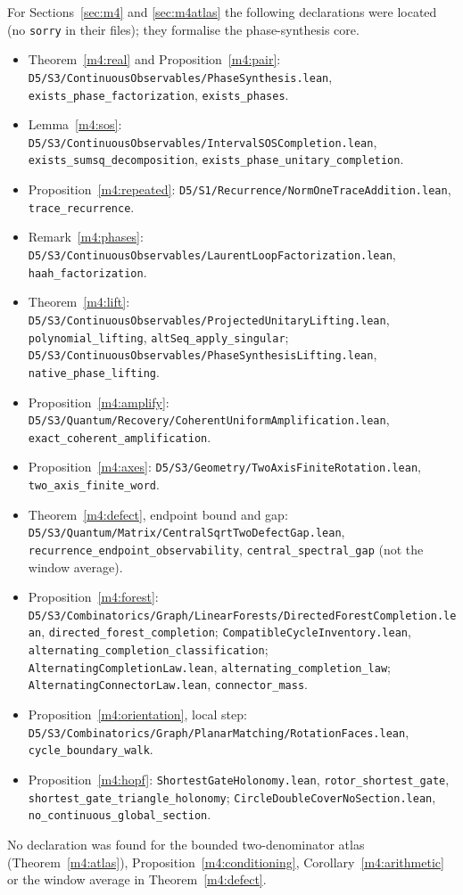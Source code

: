 \documentclass[11pt,reqno]{amsart}
\theoremstyle{definition}
\theoremstyle{remark}
\numberwithin{equation}{section}
\begin{document}
For Sections~\ref{sec:m4} and \ref{sec:m4atlas} the following declarations were located (no \texttt{sorry} in their files); they
formalise the phase-synthesis core.
{\small\raggedright
\begin{itemize}[leftmargin=1.5em]
\item Theorem~\ref{m4:real} and Proposition~\ref{m4:pair}: \texttt{D5/S3/ContinuousObservables/PhaseSynthesis.lean},
\texttt{exists\_phase\_factorization}, \texttt{exists\_phases}.
\item Lemma~\ref{m4:sos}: \texttt{D5/S3/ContinuousObservables/IntervalSOSCompletion.lean}, \texttt{exists\_sumsq\_decomposition},
\texttt{exists\_phase\_unitary\_completion}.
\item Proposition~\ref{m4:repeated}: \texttt{D5/S1/Recurrence/NormOneTraceAddition.lean}, \texttt{trace\_recurrence}.
\item Remark~\ref{m4:phases}: \texttt{D5/S3/ContinuousObservables/LaurentLoopFactorization.lean}, \texttt{haah\_factorization}.
\item Theorem~\ref{m4:lift}: \texttt{D5/S3/ContinuousObservables/ProjectedUnitaryLifting.lean}, \texttt{polynomial\_lifting},
\texttt{altSeq\_apply\_singular}; \texttt{D5/S3/ContinuousObservables/PhaseSynthesisLifting.lean}, \texttt{native\_phase\_lifting}.
\item Proposition~\ref{m4:amplify}: \texttt{D5/S3/Quantum/Recovery/CoherentUniformAmplification.lean}, \texttt{exact\_coherent\_amplification}.
\item Proposition~\ref{m4:axes}: \texttt{D5/S3/Geometry/TwoAxisFiniteRotation.lean}, \texttt{two\_axis\_finite\_word}.
\item Theorem~\ref{m4:defect}, endpoint bound and gap: \texttt{D5/S3/Quantum/Matrix/CentralSqrtTwoDefectGap.lean},
\texttt{recurrence\_endpoint\_observability}, \texttt{central\_spectral\_gap} (not the window average).
\item Proposition~\ref{m4:forest}: \texttt{D5/S3/Combinatorics/Graph/LinearForests/DirectedForestCompletion.lean}, \texttt{directed\_forest\_completion};
\texttt{CompatibleCycleInventory.lean}, \texttt{alternating\_completion\_classification}; \texttt{AlternatingCompletionLaw.lean},
\texttt{alternating\_completion\_law}; \texttt{AlternatingConnectorLaw.lean}, \texttt{connector\_mass}.
\item Proposition~\ref{m4:orientation}, local step: \texttt{D5/S3/Combinatorics/Graph/PlanarMatching/RotationFaces.lean}, \texttt{cycle\_boundary\_walk}.
\item Proposition~\ref{m4:hopf}: \texttt{ShortestGateHolonomy.lean}, \texttt{rotor\_shortest\_gate}, \texttt{shortest\_gate\_triangle\_holonomy};
\texttt{CircleDoubleCoverNoSection.lean}, \texttt{no\_continuous\_global\_section}.
\end{itemize}}
No declaration was found for the bounded two-denominator atlas (Theorem~\ref{m4:atlas}), Proposition~\ref{m4:conditioning},
Corollary~\ref{m4:arithmetic} or the window average in Theorem~\ref{m4:defect}.
\end{document}
